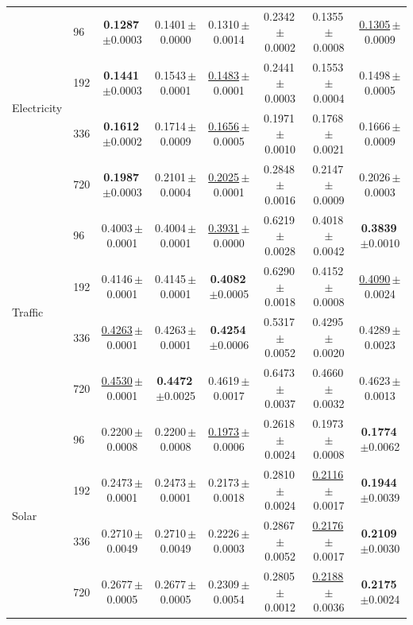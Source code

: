 \begin{tabular}{llcccccc}
\midrule
\multirow{4}{*}{Electricity} & 96 & \textbf{0.1287}\,{\tiny$\pm$0.0003} & 0.1401\,{\tiny$\pm$0.0000} & 0.1310\,{\tiny$\pm$0.0014} & 0.2342\,{\tiny$\pm$0.0002} & 0.1355\,{\tiny$\pm$0.0008} & \underline{0.1305}\,{\tiny$\pm$0.0009} \\
 & 192 & \textbf{0.1441}\,{\tiny$\pm$0.0003} & 0.1543\,{\tiny$\pm$0.0001} & \underline{0.1483}\,{\tiny$\pm$0.0001} & 0.2441\,{\tiny$\pm$0.0003} & 0.1553\,{\tiny$\pm$0.0004} & 0.1498\,{\tiny$\pm$0.0005} \\
 & 336 & \textbf{0.1612}\,{\tiny$\pm$0.0002} & 0.1714\,{\tiny$\pm$0.0009} & \underline{0.1656}\,{\tiny$\pm$0.0005} & 0.1971\,{\tiny$\pm$0.0010} & 0.1768\,{\tiny$\pm$0.0021} & 0.1666\,{\tiny$\pm$0.0009} \\
 & 720 & \textbf{0.1987}\,{\tiny$\pm$0.0003} & 0.2101\,{\tiny$\pm$0.0004} & \underline{0.2025}\,{\tiny$\pm$0.0001} & 0.2848\,{\tiny$\pm$0.0016} & 0.2147\,{\tiny$\pm$0.0009} & 0.2026\,{\tiny$\pm$0.0003} \\
\midrule
\multirow{4}{*}{Traffic} & 96 & 0.4003\,{\tiny$\pm$0.0001} & 0.4004\,{\tiny$\pm$0.0001} & \underline{0.3931}\,{\tiny$\pm$0.0000} & 0.6219\,{\tiny$\pm$0.0028} & 0.4018\,{\tiny$\pm$0.0042} & \textbf{0.3839}\,{\tiny$\pm$0.0010} \\
 & 192 & 0.4146\,{\tiny$\pm$0.0001} & 0.4145\,{\tiny$\pm$0.0001} & \textbf{0.4082}\,{\tiny$\pm$0.0005} & 0.6290\,{\tiny$\pm$0.0018} & 0.4152\,{\tiny$\pm$0.0008} & \underline{0.4090}\,{\tiny$\pm$0.0024} \\
 & 336 & \underline{0.4263}\,{\tiny$\pm$0.0001} & 0.4263\,{\tiny$\pm$0.0001} & \textbf{0.4254}\,{\tiny$\pm$0.0006} & 0.5317\,{\tiny$\pm$0.0052} & 0.4295\,{\tiny$\pm$0.0020} & 0.4289\,{\tiny$\pm$0.0023} \\
 & 720 & \underline{0.4530}\,{\tiny$\pm$0.0001} & \textbf{0.4472}\,{\tiny$\pm$0.0025} & 0.4619\,{\tiny$\pm$0.0017} & 0.6473\,{\tiny$\pm$0.0037} & 0.4660\,{\tiny$\pm$0.0032} & 0.4623\,{\tiny$\pm$0.0013} \\
\midrule
\multirow{4}{*}{Solar} & 96 & 0.2200\,{\tiny$\pm$0.0008} & 0.2200\,{\tiny$\pm$0.0008} & \underline{0.1973}\,{\tiny$\pm$0.0006} & 0.2618\,{\tiny$\pm$0.0024} & 0.1973\,{\tiny$\pm$0.0008} & \textbf{0.1774}\,{\tiny$\pm$0.0062} \\
 & 192 & 0.2473\,{\tiny$\pm$0.0001} & 0.2473\,{\tiny$\pm$0.0001} & 0.2173\,{\tiny$\pm$0.0018} & 0.2810\,{\tiny$\pm$0.0024} & \underline{0.2116}\,{\tiny$\pm$0.0017} & \textbf{0.1944}\,{\tiny$\pm$0.0039} \\
 & 336 & 0.2710\,{\tiny$\pm$0.0049} & 0.2710\,{\tiny$\pm$0.0049} & 0.2226\,{\tiny$\pm$0.0003} & 0.2867\,{\tiny$\pm$0.0052} & \underline{0.2176}\,{\tiny$\pm$0.0017} & \textbf{0.2109}\,{\tiny$\pm$0.0030} \\
 & 720 & 0.2677\,{\tiny$\pm$0.0005} & 0.2677\,{\tiny$\pm$0.0005} & 0.2309\,{\tiny$\pm$0.0054} & 0.2805\,{\tiny$\pm$0.0012} & \underline{0.2188}\,{\tiny$\pm$0.0036} & \textbf{0.2175}\,{\tiny$\pm$0.0024} \\
\bottomrule
\end{tabular}

